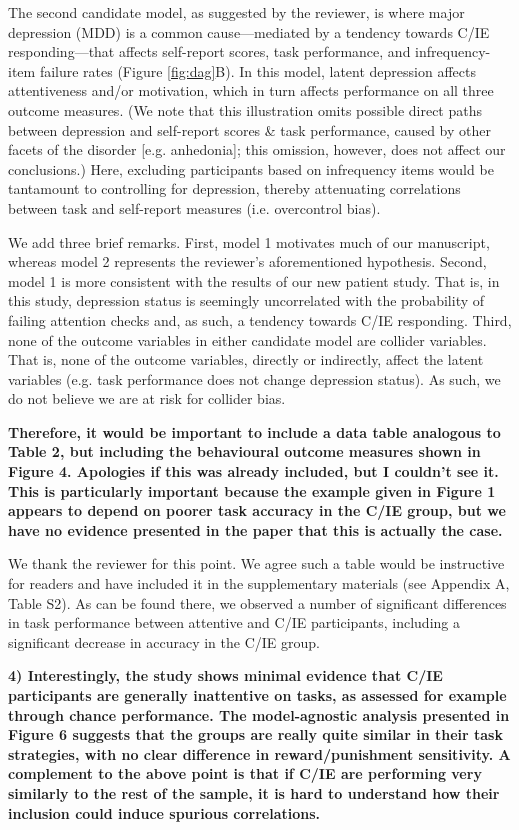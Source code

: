 \documentclass[a4paper,notitlepage,12pt]{article}
\begin{document}
The second candidate model, as suggested by the reviewer, is where major depression (MDD) is a common cause---mediated by a tendency towards C/IE responding---that affects self-report scores, task performance, and infrequency-item failure rates (Figure \ref{fig:dag}B). In this model, latent depression affects attentiveness and/or motivation, which in turn affects performance on all three outcome measures. (We note that this illustration omits possible direct paths between depression and self-report scores \& task performance, caused by other facets of the disorder [e.g. anhedonia]; this omission, however, does not affect our conclusions.) Here, excluding participants based on infrequency items would be tantamount to controlling for depression, thereby attenuating correlations between task and self-report measures (i.e. overcontrol bias).

We add three brief remarks. First, model 1 motivates much of our manuscript, whereas model 2 represents the reviewer's aforementioned hypothesis. Second, model 1 is more consistent with the results of our new patient study. That is, in this study, depression status is seemingly uncorrelated with the probability of failing attention checks and, as such, a tendency towards C/IE responding. Third, none of the outcome variables in either candidate model are collider variables. That is, none of the outcome variables, directly or indirectly, affect the latent variables (e.g. task performance does not change depression status). As such, we do not believe we are at risk for collider bias. 

\textbf{Therefore, it would be important to include a data table analogous to Table 2, but including the behavioural outcome measures shown in Figure 4. Apologies if this was already included, but I couldn't see it. This is particularly important because the example given in Figure 1 appears to depend on poorer task accuracy in the C/IE group, but we have no evidence presented in the paper that this is actually the case.}

We thank the reviewer for this point. We agree such a table would be instructive for readers and have included it in the supplementary materials (see Appendix A, Table S2). As can be found there, we observed a number of significant differences in task performance between attentive and C/IE participants, including a significant decrease in accuracy in the C/IE group.

\textbf{4) Interestingly, the study shows minimal evidence that C/IE participants are generally inattentive on tasks, as assessed for example through chance performance. The model-agnostic analysis presented in Figure 6 suggests that the groups are really quite similar in their task strategies, with no clear difference in reward/punishment sensitivity. A complement to the above point is that if C/IE are performing very similarly to the rest of the sample, it is hard to understand how their inclusion could induce spurious correlations.}
\end{document}
